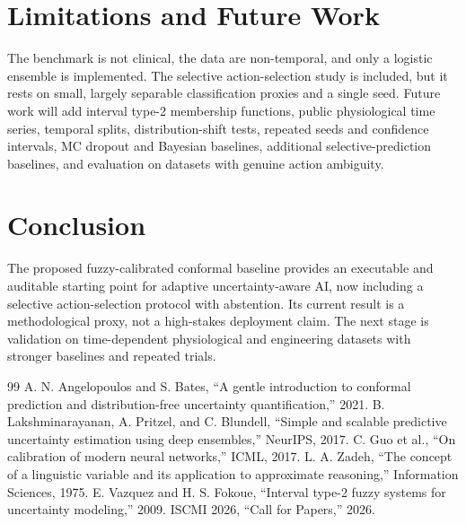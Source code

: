 \documentclass[sigconf]{acmart}
\begin{document}
\section{Limitations and Future Work}
The benchmark is not clinical, the data are non-temporal, and only a logistic ensemble is implemented. The selective action-selection study is included, but it rests on small, largely separable classification proxies and a single seed. Future work will add interval type-2 membership functions, public physiological time series, temporal splits, distribution-shift tests, repeated seeds and confidence intervals, MC dropout and Bayesian baselines, additional selective-prediction baselines, and evaluation on datasets with genuine action ambiguity.

\section{Conclusion}
The proposed fuzzy-calibrated conformal baseline provides an executable and auditable starting point for adaptive uncertainty-aware AI, now including a selective action-selection protocol with abstention. Its current result is a methodological proxy, not a high-stakes deployment claim. The next stage is validation on time-dependent physiological and engineering datasets with stronger baselines and repeated trials.

\begin{thebibliography}{99}
 A. N. Angelopoulos and S. Bates, ``A gentle introduction to conformal prediction and distribution-free uncertainty quantification,'' 2021.
 B. Lakshminarayanan, A. Pritzel, and C. Blundell, ``Simple and scalable predictive uncertainty estimation using deep ensembles,'' NeurIPS, 2017.
 C. Guo et al., ``On calibration of modern neural networks,'' ICML, 2017.
 L. A. Zadeh, ``The concept of a linguistic variable and its application to approximate reasoning,'' Information Sciences, 1975.
 E. Vazquez and H. S. Fokoue, ``Interval type-2 fuzzy systems for uncertainty modeling,'' 2009.
 ISCMI 2026, ``Call for Papers,'' 2026.
\end{thebibliography}
\end{document}
